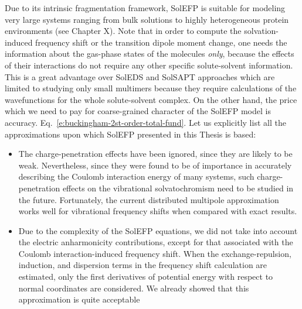 \documentclass[a4paper,titlepage,twoside,fleqn,12pt]{book}
\begin{document}
\begin{refsection}
Due to its intrinsic fragmentation framework\citep{Gordon.Fedorov.Pruitt.Slipchenko.ChemRev.2012}, 
SolEFP is suitable for modeling very large systems
ranging from bulk solutions to highly heterogeneous
protein environments \citep{Blasiak.Ritchie.Webb.Cho.XXX.2016} 
(see Chapter X). Note that in order
to compute the solvation\hyp{}induced frequency shift or the
transition dipole moment change, one needs the information
about the gas\hyp{}phase states of the molecules \emph{only}, 
because the effects of their interactions do not require 
any other specific solute\hyp{}solvent information.
This is a great advantage over SolEDS and SolSAPT approaches
which are limited to studying only small multimers because 
they require calculations of the wavefunctions for the whole
solute\hyp{}solvent complex. On the other hand, the price
which we need to pay for coarse\hyp{}grained character of the SolEFP model
is accuracy.
Eq.~\eqref{e:buckingham-2st-order-total-fund}. 
Let us 
explicitly list all the approximations upon which SolEFP presented in 
this Thesis is based:
%
\begin{itemize}
 \item The charge\hyp{}penetration effects have been ignored, since they are likely to be weak. 
Nevertheless, since they were found to be of importance in accurately describing 
the Coulomb interaction energy of many systems\citep{Slipchenko.Gordon.JCC.2007}, 
such charge\hyp{}penetration 
effects on the vibrational solvatochromism need to be studied in the future. Fortunately,
the current distributed multipole approximation works well for vibrational frequency shifts
when compared with exact results.\citep{Blasiak.Cho.JCP.2014,Blasiak.Cho.JCP.2015,
Blasiak.Ritchie.Webb.Cho.XXX.2016,Blasiak.Maj.Cho.XXX.2016}
 \item Due to the complexity of the SolEFP equations, we did not take into account the electric 
anharmonicity contributions, except for that associated with the Coulomb interaction\hyp{}induced 
frequency shift. When the exchange\hyp{}repulsion, induction, and dispersion terms in the frequency 
shift calculation are estimated, only the first derivatives of potential energy with respect 
to normal coordinates are considered. We already showed that this approximation is quite acceptable 

\end{itemize}
\end{refsection}
\end{document}
